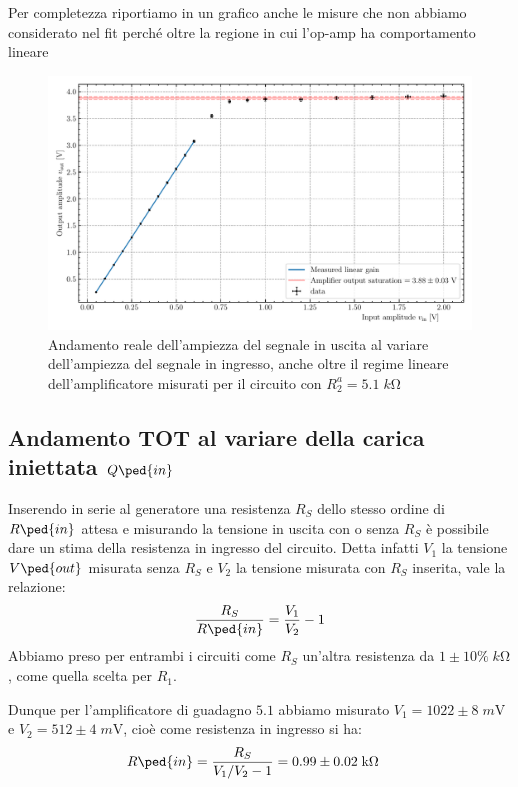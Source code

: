 \documentclass[10pt,a4paper]{article}
\begin{document}
Per completezza riportiamo in un grafico anche le misure che non abbiamo
considerato nel fit perché oltre la regione in cui l'op-amp ha comportamento
lineare
\begin{figure}[htbp]
\centering
\includegraphics[scale=0.7]{gainsat}
\caption{Andamento reale dell'ampiezza del segnale in uscita al variare
dell'ampiezza del segnale in ingresso, anche oltre il regime lineare
dell'amplificatore misurati per il circuito con $R_2^a = 5.1 \; \si{k\ohm}$
\label{fig: gainsat}}
\end{figure}

\subsection{Andamento TOT al variare della carica iniettata $Q\ped{in}$}
Inserendo in serie al generatore una resistenza $R_S$ dello stesso ordine di
$R\ped{in}$ attesa e misurando la tensione in uscita con o senza $R_S$ è
possibile dare un stima della resistenza in ingresso del circuito.
Detta infatti $V_1$ la tensione $V\ped{out}$ misurata senza $R_S$ e $V_2$ la
tensione misurata con $R_S$ inserita, vale la relazione:
\begin{equation}\label{eq: RS}
\frac{R_S}{R\ped{in}} = \frac{V_1}{V_2} - 1
\end{equation}
Abbiamo preso per entrambi i circuiti come $R_S$ un'altra resistenza da
$1 \pm 10\% \; \si{k\ohm}$, come quella scelta per $R_1$.

Dunque per l'amplificatore di guadagno $5.1$ abbiamo misurato
$V_1 = 1022 \pm 8 \; \si{m\V}$ e $V_2 = 512 \pm 4 \; \si{m\V}$, cioè come
resistenza in ingresso si ha:
\begin{align*}
{R\ped{in}} &= \frac{R_S}{V_1/V_2 - 1} = 0.99 \pm 0.02 \; \si{k\ohm}
\end{align*}
\end{document}
